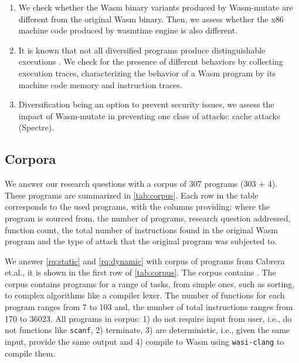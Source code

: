 \documentclass[sigplan,screen]{acmart}
\newcommand{\tool}{Wasm-mutate\xspace}
\newcommand{\wasm}{Wasm\xspace}
\newcommand{\etal}{et.al.\xspace}
\newcommand{\ie}{i.e.,\xspace}
\begin{document}
\begin{enumerate}[label=RQ\arabic*:, ref=RQ\arabic*]
     \item \label{rq:static} \textbf{\rqstatic}
        We  check whether the \wasm binary variants produced by \tool are different from the original \wasm binary. Then, we assess whether the x86 machine code produced by wasmtime engine is also different.
    
    \item \label{rq:dynamic}\textbf{\rqdynamic} 
        It is known that not all diversified programs produce distinguishable executions \cite{crane2015thwarting}. 
        We check for the presence of different behaviors by collecting execution traces, characterizing the behavior of a \wasm program by its machine code memory and instruction traces.
        
    \item \label{rq:defensive}\textbf{\rqdefensive} 
     \label{rq:performance} Diversification being an option to prevent security issues,  we assess the impact of \tool in preventing one class of attacks: cache attacks (Spectre).
        
\end{enumerate}

\subsection{Corpora}
\label{sec:corpus}



We answer our research questions with a corpus of 307 programs (303 + 4).
These programs are summarized in \autoref{tab:corpus}.
Each row in the table corresponds to the used programs, with the columns providing: where the program is sourced from, the number of programs, research question addressed, function count, the total number of instructions found in the original \wasm program and the type of attack that the original program was subjected to.

We answer \ref{rq:static} and \ref{rq:dynamic} with corpus of programs from Cabrera \etal \cite{arteaga2020crow}, it is shown in the first row of \autoref{tab:corpus}.
The corpus contains \nProgramsRosetta.
The corpus contains programs for a range of tasks, from simple ones, such as sorting, to complex algorithms like a compiler lexer. 
The number of functions for each program ranges from 7 to 103 and, the number of total instructions ranges from 170 to 36023.
All programs in corpus: 
1) do not require input from user, \ie do not  functions like \texttt{scanf}, 2) terminate, 3) are deterministic, \ie given the same input, provide the same output and 4) compile to \wasm using \texttt{wasi-clang} to compile them.
\end{document}
